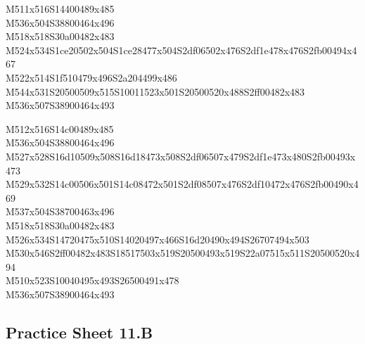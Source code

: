 \documentclass{article}
\begin{document}
\begin{multicols}{5}
\begin{center}
M511x516S14400489x485 %
\\M536x504S38800464x496 %
\\M518x518S30a00482x483 %
\\M524x534S1ce20502x504S1ce28477x504S2df06502x476S2df1e478x476S2fb00494x467 %
\\M522x514S1f510479x496S2a204499x486 %
\\M544x531S20500509x515S10011523x501S20500520x488S2ff00482x483 %
\\M536x507S38900464x493 %
\vfil
\columnbreak

M512x516S14c00489x485 %
\\M536x504S38800464x496 %
\\M527x528S16d10509x508S16d18473x508S2df06507x479S2df1e473x480S2fb00493x473 %
\\M529x532S14c00506x501S14c08472x501S2df08507x476S2df10472x476S2fb00490x469 %
\\M537x504S38700463x496 %
\\M518x518S30a00482x483 %
\\M526x534S14720475x510S14020497x466S16d20490x494S26707494x503 %
\\M530x546S2ff00482x483S18517503x519S20500493x519S22a07515x511S20500520x494 %
\\M510x523S10040495x493S26500491x478 %
\\M536x507S38900464x493 %
\vfil

\end{center}
\end{multicols}

\subsection{Practice Sheet 11.B}
\end{document}
